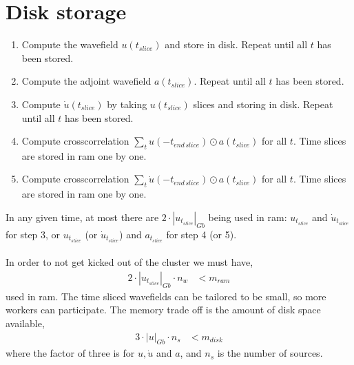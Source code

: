 \documentclass[a4paper,12pt]{article}
\begin{document}
\section*{Disk storage}
\begin{enumerate}
\item Compute the wavefield $u(t_{slice})$ and store in disk. Repeat until all $t$ has been stored.
\item Compute the adjoint wavefield $a(t_{slice})$. Repeat until all $t$ has been stored.
\item Compute $\dot{u}(t_{slice})$ by taking $u(t_{slice})$ slices and storing in disk. Repeat until all $t$ has been stored.
\item Compute crosscorrelation $\sum_t u(-t_{end\,slice})\odot a(t_{slice})$ for all $t$. Time slices are stored in ram one by one.
\item Compute crosscorrelation $\sum_t \dot{u}(-t_{end\,slice})\odot a(t_{slice})$ for all $t$. Time slices are stored in ram one by one.
\end{enumerate}
In any given time, at most there are $2\cdot |u_{t_{slice}}|_{Gb}$ being used in ram: $u_{t_{slice}}$ and $\dot{u}_{t_{slice}}$ for step 3, or $u_{t_{slice}}$ (or $\dot{u}_{t_{slice}}$) and $a_{t_{slice}}$ for step 4 (or 5). 
\\\\
In order to not get kicked out of the cluster we must have,
\begin{align*}
2\cdot|u_{t_{slice}}|_{Gb}\cdot n_w &< m_{ram}
\end{align*}
used in ram.
The time sliced wavefields can be tailored to be small, so more workers can participate. The memory trade off is the amount of disk space available,
\begin{align*}
3\cdot|u|_{Gb}\cdot n_s &< m_{disk}
\end{align*}
where the factor of three is for $u,\dot{u}$ and $a$, and $n_s$ is the number of sources.
\end{document}
